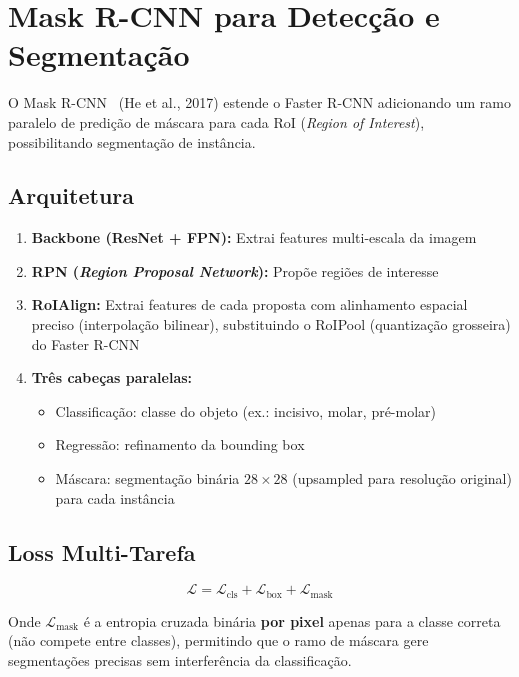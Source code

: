 \section{Mask R-CNN para Detecção e Segmentação}
\label{sec:mask-rcnn}

O Mask R-CNN~\cite{he2017maskrcnn} (He et al., 2017) estende o Faster R-CNN adicionando um ramo
paralelo de predição de máscara para cada RoI (\textit{Region of Interest}),
possibilitando segmentação de instância.

\subsection{Arquitetura}

\begin{enumerate}
  \item \textbf{Backbone (ResNet + FPN):} Extrai features multi-escala da imagem
  \item \textbf{RPN (\textit{Region Proposal Network}):} Propõe regiões de interesse
  \item \textbf{RoIAlign:} Extrai features de cada proposta com alinhamento
        espacial preciso (interpolação bilinear), substituindo o RoIPool
        (quantização grosseira) do Faster R-CNN
  \item \textbf{Três cabeças paralelas:}
        \begin{itemize}
          \item Classificação: classe do objeto (ex.: incisivo, molar, pré-molar)
          \item Regressão: refinamento da bounding box
          \item Máscara: segmentação binária $28\times28$ (upsampled para
                resolução original) para cada instância
        \end{itemize}
\end{enumerate}

\subsection{Loss Multi-Tarefa}

\begin{equation}
  \mathcal{L} = \mathcal{L}_{\text{cls}} + \mathcal{L}_{\text{box}} + \mathcal{L}_{\text{mask}}
  \label{eq:mask-rcnn-loss}
\end{equation}

Onde $\mathcal{L}_{\text{mask}}$ é a entropia cruzada binária \textbf{por pixel}
apenas para a classe correta (não compete entre classes), permitindo que o ramo
de máscara gere segmentações precisas sem interferência da classificação.

